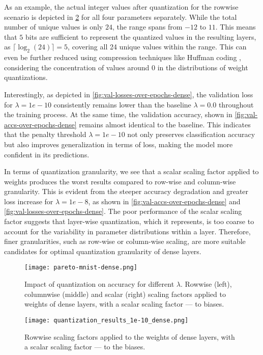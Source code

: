 As an example, the actual integer values after quantization for the rowwise scenario is 
depicted in \cref{fig:quantization_results_1e-10_dense} for all four parameters separately.
While the total number of unique values is only \( 24 \), the range spans from \( -12 \) to \( 11 \).
This means that \( 5 \) bits are sufficient to represent the quantized values in the resulting layers, 
as \( \lceil \log_2(24) \rceil = 5 \), covering all 24 unique values within the range. 
This can even be further reduced using compression techniques like Huffman coding \cite{4051119}, 
considering the concentration of values around 0 in the distributions of weight quantizations.

Interestingly, as depicted in \cref{fig:val-losses-over-epochs-dense}, 
the validation loss for \( \lambda = 1e-10 \) 
consistently remains lower than the baseline  \( \lambda = 0.0 \) throughout the training process.
At the same time, the validation accuracy, shown in \cref{fig:val-accs-over-epochs-dense}
remains almost identical to the baseline. This indicates that the penalty threshold
\( \lambda = 1e-10 \) 
not only preserves classification accuracy
but also improves generalization in terms of loss,
making the model more confident in its predictions.

In terms of quantization granularity, we see that a scalar scaling factor applied to 
weights produces the worst results compared to row-wise and column-wise granularity.
This is evident from the steeper accuracy degradation and greater loss increase for
 \( \lambda = 1e-8\), as shown in \cref{fig:val-accs-over-epochs-dense} and
\cref{fig:val-losses-over-epochs-dense}.
The poor performance of the scalar scaling factor suggests 
that layer-wise quantization, 
which it represents, 
is too coarse to account for the variability in parameter distributions within a layer.
Therefore, finer granularities, such as row-wise or column-wise scaling, 
are more suitable candidates for optimal quantization granularity of dense layers.

\begin{figure}[t!]
  \centering
  \texttt{[image: pareto-mnist-dense.png]}
  \caption{Impact of quantization on accuracy for different \( \lambda \). Rowwise (left), columnwise (middle) and scalar (right) scaling factors applied to weights of dense layers, with a scalar scaling factor — to biases.}
  \label{fig:pareto-mnist-dense}
\end{figure}


\begin{figure}[t!]
  \centering
  \texttt{[image: quantization\_results\_1e-10\_dense.png]}
  \caption{Rowwise scaling factors applied to the weights of dense layers, with a scalar scaling factor — to the biases.}
  \label{fig:quantization_results_1e-10_dense}
\end{figure}


